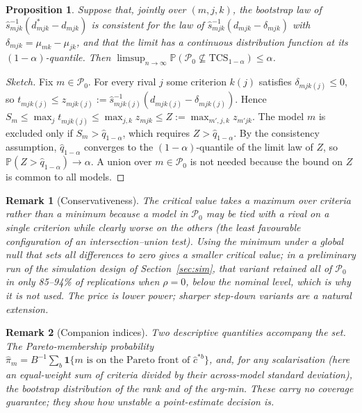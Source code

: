 \documentclass[pdflatex,sn-mathphys-num,iicol]{sn-jnl}
\theoremstyle{thmstyleone}
\newtheorem{proposition}[theorem]{Proposition}
\theoremstyle{thmstyletwo}
\newtheorem{remark}{Remark}
\renewcommand{\Pr}{\mathbb{P}}
\begin{document}
\begin{proposition}\label{prop:cov}
Suppose that, jointly over $(m,j,k)$, the bootstrap law of $\hat s_{mjk}^{-1}(d^{*}_{mjk}-d_{mjk})$ is consistent for the law of $\hat s_{mjk}^{-1}(d_{mjk}-\delta_{mjk})$ with $\delta_{mjk}=\mu_{mk}-\mu_{jk}$, and that the limit has a continuous distribution function at its $(1-\alpha)$-quantile. Then $\limsup_{n\to\infty}\Pr(\mathcal{P}_0\not\subseteq \mathrm{TCS}_{1-\alpha})\le\alpha$.
\end{proposition}
\begin{proof}[Sketch]
Fix $m\in\mathcal{P}_0$. For every rival $j$ some criterion $k(j)$ satisfies $\delta_{mjk(j)}\le0$, so $t_{mjk(j)}\le z_{mjk(j)}:=\hat s_{mjk(j)}^{-1}(d_{mjk(j)}-\delta_{mjk(j)})$. Hence $S_m\le\max_j t_{mjk(j)}\le\max_{j,k}z_{mjk}\le Z:=\max_{m',j,k}z_{m'jk}$. The model $m$ is excluded only if $S_m>\hat q_{1-\alpha}$, which requires $Z>\hat q_{1-\alpha}$. By the consistency assumption, $\hat q_{1-\alpha}$ converges to the $(1-\alpha)$-quantile of the limit law of $Z$, so $\Pr(Z>\hat q_{1-\alpha})\to\alpha$. A union over $m\in\mathcal{P}_0$ is not needed because the bound on $Z$ is common to all models.
\end{proof}

\begin{remark}[Conservativeness]
The critical value takes a maximum over criteria rather than a minimum because a model in $\mathcal{P}_0$ may be tied with a rival on a single criterion while clearly worse on the others (the least favourable configuration of an intersection--union test). Using the minimum under a global null that sets all differences to zero gives a smaller critical value; in a preliminary run of the simulation design of Section~\ref{sec:sim}, that variant retained all of $\mathcal{P}_0$ in only 85--94\% of replications when $\rho=0$, below the nominal level, which is why it is not used. The price is lower power; sharper step-down variants \cite{romano2005} are a natural extension.
\end{remark}

\begin{remark}[Companion indices]
Two descriptive quantities accompany the set. The Pareto-membership probability $\hat\pi_m=B^{-1}\sum_b \mathbf{1}\{m \text{ is on the Pareto front of } \hat c^{*b}\}$, and, for any scalarisation (here an equal-weight sum of criteria divided by their across-model standard deviation), the bootstrap distribution of the rank and of the arg-min. These carry no coverage guarantee; they show how unstable a point-estimate decision is.
\end{remark}
\end{document}

